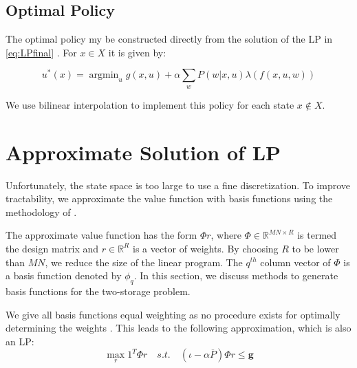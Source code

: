 \documentclass[conference]{IEEEtran}
\DeclareMathOperator*{\argmin}{argmin}
\begin{document}
\subsection{Optimal Policy}
The optimal policy my be constructed directly from the solution of the LP in \eqref{eq:LPfinal} \cite{Bertsekas:2007:DPO:1396348}. For $x\in X$ it is given by:

\begin{equation}
    u^{*}(x)=\argmin_{u} g(x,u)+\alpha \sum_{w} P(w|x,u)\lambda(f(x,u,w))
\end{equation}

We use bilinear interpolation to implement this policy for each state $x\not\in X$. %



\section{Approximate Solution of LP}
Unfortunately, the state space is too large to use a fine discretization. To improve tractability, we approximate the value function with basis functions using the methodology of \cite{deFarias:2003:LPA:970869.970918}.

The approximate value function has the form $\Phi r$, where $\Phi \in \mathbb{R}^{MN\times R}$ is termed the design matrix and $r\in \mathbb{R}^R$ is a vector of weights. By choosing $R$ to be lower than $MN$, we reduce the size of the linear program. The $q^{th}$ column vector of $\Phi$ is a basis function denoted by $\phi_{q}$. In this section, we discuss methods to generate basis functions for the two-storage problem.

We give all basis functions equal weighting as no procedure exists for optimally determining the weights \cite{deFarias:2003:LPA:970869.970918, PatrascuReluEugen2004}. This leads to the following approximation, which is also an LP:
\begin{equation} \label{eq:ApproxLP}
    \max_{r} 1^{T} \Phi r
    \hspace{1em}s.t.\hspace{1em}
    (\iota-\alpha \overline{P})\Phi r \leq \boldsymbol{g}
\end{equation}
\end{document}
